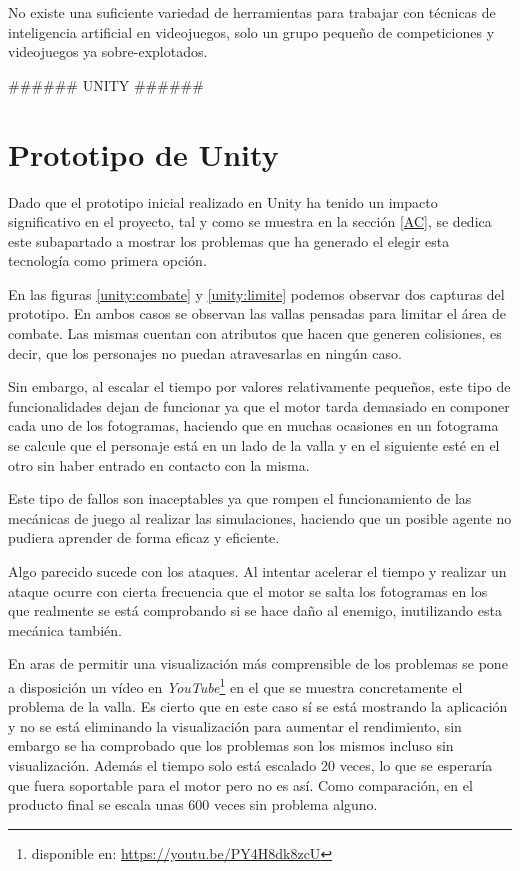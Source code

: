 \bigskip

No existe una suficiente variedad de herramientas para trabajar con técnicas de inteligencia artificial en videojuegos, solo un grupo pequeño de competiciones y videojuegos ya sobre-explotados.



###### UNITY ######

\section{Prototipo de Unity}

Dado que el prototipo inicial realizado en Unity ha tenido un impacto significativo en el proyecto, tal y como se muestra en la sección \ref{AC}, se dedica este subapartado a mostrar los problemas que ha generado el elegir esta tecnología como primera opción.

\bigskip

En las figuras \ref{unity:combate} y \ref{unity:limite} podemos observar dos capturas del prototipo. En ambos casos se observan las vallas pensadas para limitar el área de combate. Las mismas cuentan con atributos que hacen que generen colisiones, es decir, que los personajes no puedan atravesarlas en ningún caso.

\bigskip

Sin embargo, al escalar el tiempo por valores relativamente pequeños, este tipo de funcionalidades dejan de funcionar ya que el motor tarda demasiado en componer cada uno de los fotogramas, haciendo que en muchas ocasiones en un fotograma se calcule que el personaje está en un lado de la valla y en el siguiente esté en el otro sin haber entrado en contacto con la misma.

\bigskip

Este tipo de fallos son inaceptables ya que rompen el funcionamiento de las mecánicas de juego al realizar las simulaciones, haciendo que un posible agente no pudiera aprender de forma eficaz y eficiente.

\bigskip

Algo parecido sucede con los ataques. Al intentar acelerar el tiempo y realizar un ataque ocurre con cierta frecuencia que el motor se salta los fotogramas en los que realmente se está comprobando si se hace daño al enemigo, inutilizando esta mecánica también.

\bigskip

En aras de permitir una visualización más comprensible de los problemas se pone a disposición un vídeo en \textit{YouTube}\footnote{disponible en: \url{https://youtu.be/PY4H8dk8zcU}} en el que se muestra concretamente el problema de la valla. Es cierto que en este caso sí se está mostrando la aplicación y no se está eliminando la visualización para aumentar el rendimiento, sin embargo se ha comprobado que los problemas son los mismos incluso sin visualización. Además el tiempo solo está escalado 20 veces, lo que se esperaría que fuera soportable para el motor pero no es así. Como comparación, en el producto final se escala unas 600 veces sin problema alguno.

